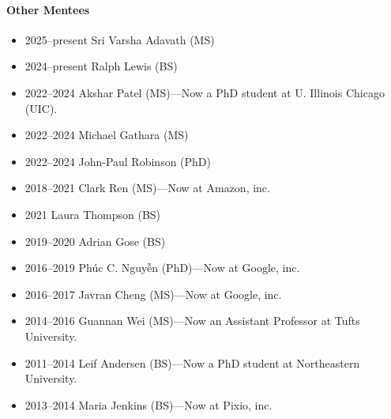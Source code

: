 \paragraph{Other Mentees}
\begin{itemize}
\vspace{0.15cm}\item 2025--present Sri Varsha Adavath (MS)
\item 2024--present Ralph Lewis (BS)
\item 2022--2024 Akshar Patel (MS)---Now a PhD student at U. Illinois Chicago (UIC).
\item 2022--2024 Michael Gathara (MS)
\item 2022--2024 John-Paul Robinson (PhD)
\item 2018--2021 Clark Ren (MS)---Now at Amazon, inc.
\item 2021 Laura Thompson (BS)
\item 2019--2020 Adrian Gose (BS)
\item 2016--2019 Phúc C. Nguyễn (PhD)---Now at Google, inc.
\item 2016--2017 Javran Cheng (MS)---Now at Google, inc.
\item 2014--2016 Guannan Wei (MS)---Now an Assistant Professor at Tufts University.
\item 2011--2014 Leif Andersen (BS)---Now a PhD student at Northeastern University.
\item 2013--2014 Maria Jenkins (BS)---Now at Pixio, inc.
\end{itemize}
